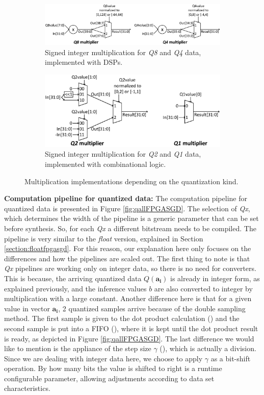 \documentclass{article}
\newcommand*\circled[1]{\tikz[baseline=(char.base)]{
\node[shape=circle,draw,color=black,text=black,inner sep=0.05pt](char){#1};}}
\begin{document}
\begin{figure}[t]
\centering
\begin{subfigure}{.9\columnwidth}
\centering
\includegraphics[width=\columnwidth]{Figures/Q8Q4mult.eps}
\caption{Signed integer multiplication for \textit{Q8} and \textit{Q4} data, implemented with DSPs.}
\label{fig:Q8Q4mult}
\end{subfigure}
\begin{subfigure}{\columnwidth}
\centering
\includegraphics[width=.7\columnwidth]{Figures/Q2Q1mult.eps}
\caption{Signed integer multiplication for \textit{Q2} and \textit{Q1} data, implemented with combinational logic.}
\label{fig:Q2Q1mult}
\end{subfigure}
\caption{Multiplication implementations depending on the quantization kind.}
\label{fig:Qmult}
\end{figure}

\noindent
\textbf{Computation pipeline for quantized data:} The computation pipeline for quantized data is presented in Figure \ref{fig:qallFPGASGD}. The selection of \textit{Qx}, which determines the width of the pipeline is a generic parameter that can be set before synthesis. So, for each \textit{Qx} a different bitstream needs to be compiled. The pipeline is very similar to the \textit{float} version, explained in Section \ref{section:floatfpgasgd}. For this reason, our explanation here only focuses on the differences and how the pipelines are scaled out. The first thing to note is that \textit{Qx} pipelines are working only on integer data, so there is no need for converters. This is because, the arriving quantized data $Q(\mathbf{a_i})$ is already in integer form, as explained previously, and the inference values $b$ are also converted to integer by multiplication with a large constant. Another difference here is that for a given value in vector $\mathbf{a_i}$, 2 quantized samples arrive because of the double sampling method. The first sample is given to the dot product calculation (\circled{1}) and the second sample is put into a FIFO (\circled{A}), where it is kept until the dot product result is ready, as depicted in Figure \ref{fig:qallFPGASGD}. The last difference we would like to mention is the appliance of the step size $\gamma$ (\circled{2}), which is actually a division. Since we are dealing with integer data here, we choose to apply $\gamma$ as a bit-shift operation. By how many bits the value is shifted to right is a runtime configurable parameter, allowing adjustments according to data set characteristics.
\end{document}
